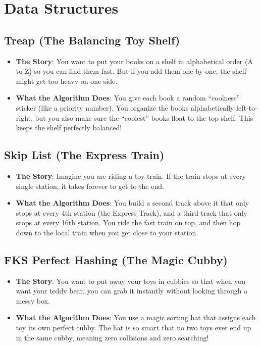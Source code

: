 \documentclass[twoside,12pt]{book}
\theoremstyle{plain}
\theoremstyle{definition}
\theoremstyle{remark}
\begin{document}
\section{Data Structures}

\subsection{Treap (The Balancing Toy Shelf)}
\begin{itemize}
    \item \textbf{The Story}: You want to put your books on a shelf in alphabetical order (A to Z) so you can find them fast. But if you add them one by one, the shelf might get too heavy on one side.
    \item \textbf{What the Algorithm Does}: You give each book a random ``coolness'' sticker (like a priority number). You organize the books alphabetically left-to-right, but you also make sure the ``coolest'' books float to the top shelf. This keeps the shelf perfectly balanced!
\end{itemize}

\subsection{Skip List (The Express Train)}
\begin{itemize}
    \item \textbf{The Story}: Imagine you are riding a toy train. If the train stops at every single station, it takes forever to get to the end.
    \item \textbf{What the Algorithm Does}: You build a second track above it that only stops at every 4th station (the Express Track), and a third track that only stops at every 16th station. You ride the fast train on top, and then hop down to the local train when you get close to your station.
\end{itemize}

\subsection{FKS Perfect Hashing (The Magic Cubby)}
\begin{itemize}
    \item \textbf{The Story}: You want to put away your toys in cubbies so that when you want your teddy bear, you can grab it instantly without looking through a messy box.
    \item \textbf{What the Algorithm Does}: You use a magic sorting hat that assigns each toy its own perfect cubby. The hat is so smart that no two toys ever end up in the same cubby, meaning zero collisions and zero searching!
\end{itemize}
\end{document}
